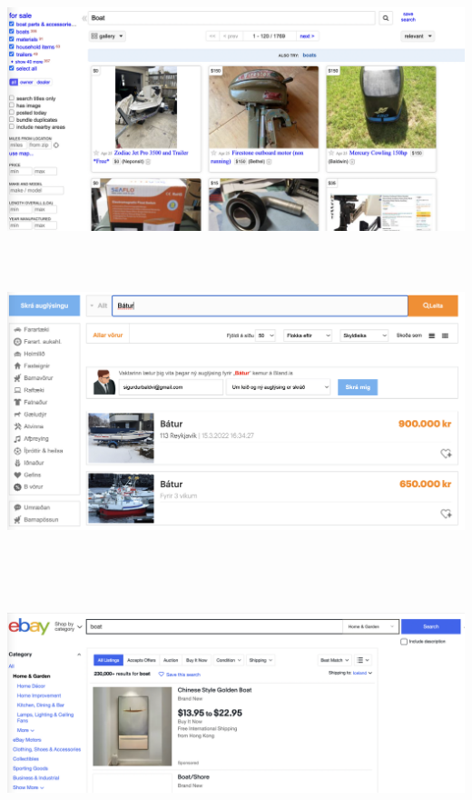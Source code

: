 \begin{Figure}
    \begin{center}
        \includegraphics[width=150mm, height=80mm]{Images/benchmarking/search_result_cl.png}
    \end{center}
\end{Figure}
\begin{Figure}
    \begin{center}
        \includegraphics[width=150mm, height=80mm]{Images/benchmarking/search_result_bland.png}
    \end{center}
\end{Figure}
\begin{Figure}
    \begin{center}
        \includegraphics[width=150mm, height=80mm]{Images/benchmarking/search_result_ebay.png}
    \end{center}
\end{Figure}
